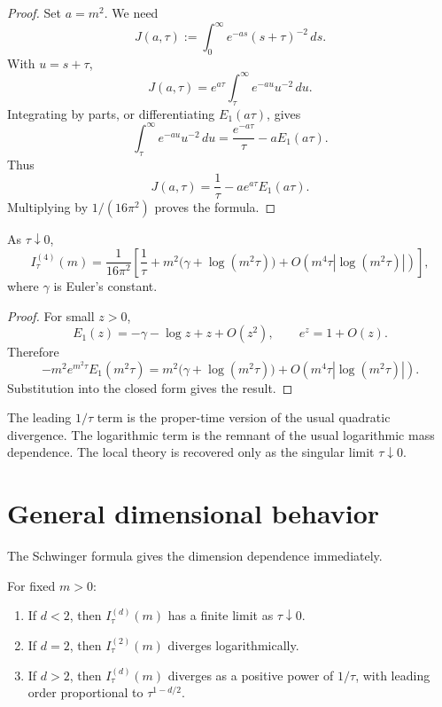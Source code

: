 \documentclass[11pt]{article}
\begin{document}
\begin{proof}
Set \(a=m^2\). We need
\[
J(a,\tau):=\int_0^\infty e^{-as}(s+\tau)^{-2}\,ds.
\]
With \(u=s+\tau\),
\[
J(a,\tau)=e^{a\tau}\int_\tau^\infty e^{-au}u^{-2}\,du.
\]
Integrating by parts, or differentiating \(E_1(a\tau)\), gives
\[
\int_\tau^\infty e^{-au}u^{-2}\,du
=
\frac{e^{-a\tau}}{\tau}
-
aE_1(a\tau).
\]
Thus
\[
J(a,\tau)=\frac{1}{\tau}-ae^{a\tau}E_1(a\tau).
\]
Multiplying by \(1/(16\pi^2)\) proves the formula.
\end{proof}

\begin{corollary}[Local-limit asymptotics in \(d=4\)]
As \(\tau\downarrow0\),
\[
I_\tau^{(4)}(m)
=
\frac{1}{16\pi^2}
\left[
\frac{1}{\tau}
+
m^2\bigl(\gamma+\log(m^2\tau)\bigr)
+
O\!\left(m^4\tau|\log(m^2\tau)|\right)
\right],
\]
where \(\gamma\) is Euler's constant.
\end{corollary}

\begin{proof}
For small \(z>0\),
\[
E_1(z)=-\gamma-\log z+z+O(z^2),
\qquad
e^z=1+O(z).
\]
Therefore
\[
-m^2e^{m^2\tau}E_1(m^2\tau)
=
m^2\bigl(\gamma+\log(m^2\tau)\bigr)
+
O(m^4\tau|\log(m^2\tau)|).
\]
Substitution into the closed form gives the result.
\end{proof}

\begin{remark}
The leading \(1/\tau\) term is the proper-time version of the usual quadratic divergence. The logarithmic term is the remnant of the usual logarithmic mass dependence. The local theory is recovered only as the singular limit \(\tau\downarrow0\).
\end{remark}

\section{General dimensional behavior}

The Schwinger formula gives the dimension dependence immediately.

\begin{proposition}
For fixed \(m>0\):
\begin{enumerate}
\item If \(d<2\), then \(I_\tau^{(d)}(m)\) has a finite limit as \(\tau\downarrow0\).
\item If \(d=2\), then \(I_\tau^{(2)}(m)\) diverges logarithmically.
\item If \(d>2\), then \(I_\tau^{(d)}(m)\) diverges as a positive power of \(1/\tau\), with leading order proportional to \(\tau^{1-d/2}\).
\end{enumerate}
\end{proposition}
\end{document}
